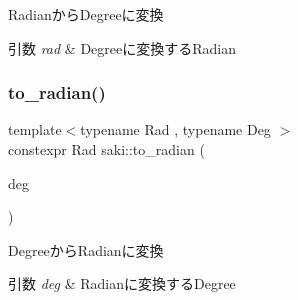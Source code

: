 Radianから\+Degreeに変換 


\begin{DoxyParams}{引数}
{\em rad} & Degreeに変換する\+Radian \\
\hline
\end{DoxyParams}
\mbox{\label{namespacesaki_aae246ec576e9e2da23c0c142e6fc4d6a}} 
\subsubsection{\texorpdfstring{to\+\_\+radian()}{to\_radian()}}
{\footnotesize\ttfamily template$<$typename Rad , typename Deg $>$ \\
constexpr Rad saki\+::to\+\_\+radian (\begin{DoxyParamCaption}\item[{Deg}]{deg }\end{DoxyParamCaption})}



Degreeから\+Radianに変換 


\begin{DoxyParams}{引数}
{\em deg} & Radianに変換する\+Degree \\
\hline
\end{DoxyParams}
